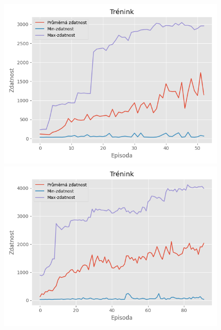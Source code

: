 \documentclass[a4paper,12pt]{article}
\begin{document}
            \begin{figure}[H]
                \centering
                \begin{minipage}[t]{.5\textwidth}
                    \centering
                    \includegraphics[trim = 0 1cm 0 1cm, clip, width=1\linewidth]{../data/f0.png}
                \end{minipage}%
                \begin{minipage}[t]{.5\textwidth}
                    \centering
                    \includegraphics[trim = 0 1cm 0 1cm, clip,width=1\linewidth]{../data/f1.png}
                \end{minipage}
                \label{fig:results}
            \end{figure}
\end{document}
